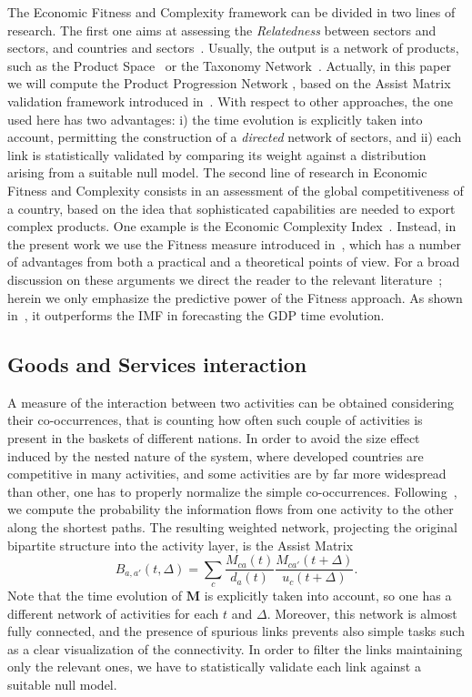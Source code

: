 \documentclass[fleqn,10pt]{article}
\begin{document}
The Economic Fitness and Complexity framework can be divided in two lines of research.
The first one aims at assessing the \textit{Relatedness} between sectors and sectors, and countries and sectors~\cite{hidalgo2018principle}. 
Usually, the output is a network of products, such as the Product Space~\cite{Hidalgo2009} or the Taxonomy Network~\cite{Zaccaria2014}. 
Actually, in this paper we will compute the Product Progression Network \cite{Zaccaria2018services}, based on the Assist Matrix validation framework introduced in~\cite{Pugliese2017}. 
With respect to other approaches, the one used here has two advantages: i) the time evolution is explicitly taken into account, permitting the construction of a \textit{directed} network of sectors, and ii) each link is statistically validated by comparing its weight against a distribution arising from a suitable null model.
The second line of research in Economic Fitness and Complexity consists in an assessment of the global competitiveness of a country, based on the idea that sophisticated capabilities are needed to export complex products.
One example is the Economic Complexity Index~\cite{Hidalgo2009}. 
Instead, in the present work we use the Fitness measure introduced in~\cite{Tacchella2012}, which has a number of advantages from both a practical and a theoretical points of view. 
For a broad discussion on these arguments we direct the reader to the relevant literature~\cite{Albeaik2017a,Gabrielli2017,Albeaik2017b,Pietronero2017}; herein we only emphasize the predictive power of the Fitness approach.
As shown in~\cite{Tacchella2018}, it outperforms the IMF in forecasting the GDP time evolution.


\subsection*{Goods and Services interaction}
A measure of the interaction between two activities can be obtained considering their co-occurrences, that is counting how often such couple of activities is present in the baskets of different nations. 
In order to avoid the size effect induced by the nested nature of the system, where developed countries are competitive in many activities, and some activities are by far more widespread than other, one has to properly normalize the simple co-occurrences. 
Following~\cite{Pugliese2017}, we compute the probability the information flows from one activity to the other along the shortest paths.
The resulting weighted network, projecting the original bipartite structure into the activity layer, is the Assist Matrix
\begin{equation}
	B_{a,a'}(t,\Delta) = \sum_{c} \frac{M_{ca}(t)}{d_a(t)}\frac{M_{ca'}(t+\Delta)}{u_c(t+\Delta)}.
	\label{eq:assist}
\end{equation}
Note that the time evolution of $\textbf{M}$ is explicitly taken into account, so one has a different network of activities for each $t$ and $\Delta$. 
Moreover, this network is almost fully connected, and the presence of spurious links prevents also simple tasks such as a clear visualization of the connectivity. 
In order to filter the links maintaining only the relevant ones, we have to statistically validate each link against a suitable null model.
\end{document}
